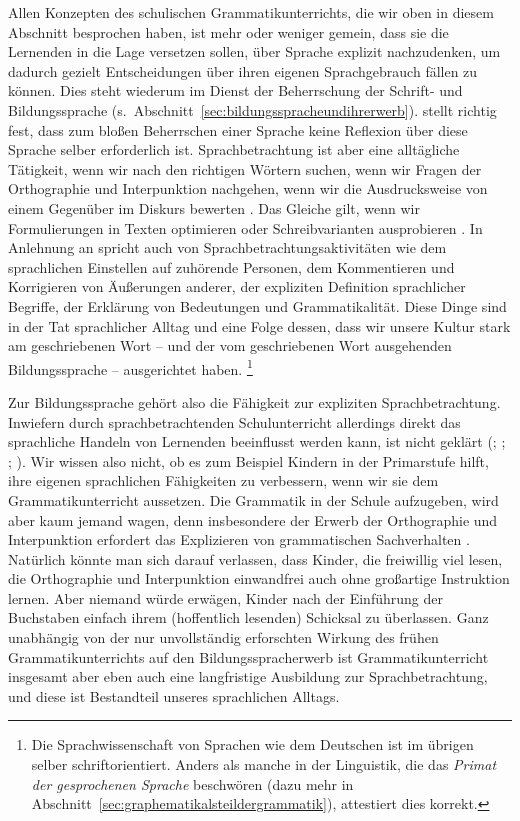Allen Konzepten des schulischen Grammatikunterrichts, die wir oben in diesem Abschnitt besprochen haben, ist mehr oder weniger gemein, dass sie die Lernenden in die Lage versetzen sollen, über Sprache explizit nachzudenken, um dadurch gezielt Entscheidungen über ihren eigenen Sprachgebrauch fällen zu können.
Dies steht wiederum im Dienst der Beherrschung der Schrift- und Bildungssprache (s.\ Abschnitt~\ref{sec:bildungsspracheundihrerwerb}).
\citet[14]{Bredel2013} stellt richtig fest, dass zum bloßen Beherrschen einer Sprache keine Reflexion über diese Sprache selber erforderlich ist.
Sprachbetrachtung ist aber eine alltägliche Tätigkeit, \zB wenn wir nach den richtigen Wörtern suchen, wenn wir Fragen der Orthographie und Interpunktion nachgehen, wenn wir die Ausdrucksweise von einem Gegenüber im Diskurs bewerten \citep[22]{Bredel2013}.
Das Gleiche gilt, wenn wir \zB Formulierungen in Texten optimieren oder Schreibvarianten ausprobieren \citep[23]{Bredel2013}.
In Anlehnung an \citet{Clark1978} spricht \citet[35]{Bredel2013} auch von Sprachbetrachtungsaktivitäten wie dem sprachlichen Einstellen auf zuhörende Personen, dem Kommentieren und Korrigieren von Äußerungen anderer, der expliziten Definition sprachlicher Begriffe, der Erklärung von Bedeutungen und Grammatikalität.
Diese Dinge sind in der Tat sprachlicher Alltag und eine Folge dessen, dass wir unsere Kultur stark am geschriebenen Wort -- und der vom geschriebenen Wort ausgehenden Bildungssprache -- ausgerichtet haben.%
\footnote{Die Sprachwissenschaft von Sprachen wie dem Deutschen ist im übrigen selber schriftorientiert.
Anders als manche in der Linguistik, die das \textit{Primat der gesprochenen Sprache} beschwören (dazu mehr in Abschnitt~\ref{sec:graphematikalsteildergrammatik}), attestiert \citet[40]{Bredel2013} dies korrekt.}

Zur Bildungssprache gehört also die Fähigkeit zur expliziten Sprachbetrachtung.
Inwiefern durch sprachbetrachtenden Schulunterricht allerdings direkt das sprachliche Handeln von Lernenden beeinflusst werden kann, ist nicht geklärt (\citealt[73,75--79,80]{Portmanntselikas2011}; \citealt[94]{Bredel2013}; \citealt[8]{Eisenberg2013c}; \citealt[2]{KoepckeZiegler2013}).
Wir wissen also nicht, ob es zum Beispiel Kindern in der Primarstufe hilft, ihre eigenen sprachlichen Fähigkeiten zu verbessern, wenn wir sie dem Grammatikunterricht aussetzen.
Die Grammatik in der Schule aufzugeben, wird aber kaum jemand wagen, denn insbesondere der Erwerb der Orthographie und Interpunktion erfordert das Explizieren von grammatischen Sachverhalten \citep[9--10]{Eisenberg2013c}.
Natürlich könnte man sich darauf verlassen, dass Kinder, die freiwillig viel lesen, die Orthographie und Interpunktion einwandfrei auch ohne großartige Instruktion lernen.
Aber niemand würde erwägen, Kinder nach der Einführung der Buchstaben einfach ihrem (hoffentlich lesenden) Schicksal zu überlassen.
Ganz unabhängig von der nur unvollständig erforschten Wirkung des frühen Grammatikunterrichts auf den Bildungsspracherwerb ist Grammatikunterricht insgesamt aber eben auch eine langfristige Ausbildung zur Sprachbetrachtung, und diese ist Bestandteil unseres sprachlichen Alltags.


